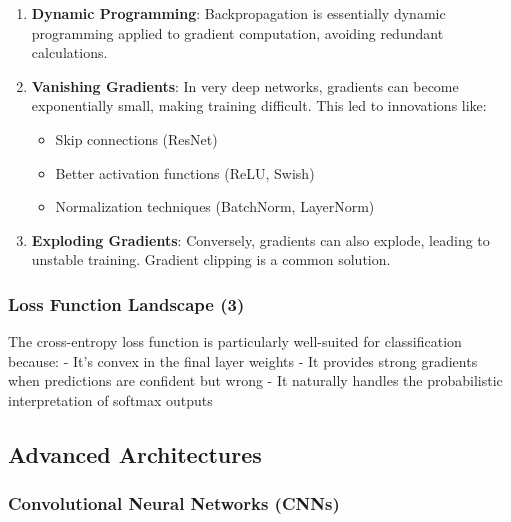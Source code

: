 \documentclass[
]{article}
\providecommand{\tightlist}{%
  \setlength{\itemsep}{0pt}\setlength{\parskip}{0pt}}
\begin{document}
\begin{enumerate}
\def\labelenumi{\arabic{enumi}.}
\setcounter{enumi}{1}
\item
  \textbf{Dynamic Programming}: Backpropagation is essentially dynamic
  programming applied to gradient computation, avoiding redundant
  calculations.
\item
  \textbf{Vanishing Gradients}: In very deep networks, gradients can
  become exponentially small, making training difficult. This led to
  innovations like:

  \begin{itemize}
  \tightlist
  \item
    Skip connections (ResNet)
  \item
    Better activation functions (ReLU, Swish)
  \item
    Normalization techniques (BatchNorm, LayerNorm)
  \end{itemize}
\item
  \textbf{Exploding Gradients}: Conversely, gradients can also explode,
  leading to unstable training. Gradient clipping is a common solution.
\end{enumerate}

\subsubsection{Loss Function Landscape
(3)}\label{loss-function-landscape-3}

The cross-entropy loss function is particularly well-suited for
classification because: - It's convex in the final layer weights - It
provides strong gradients when predictions are confident but wrong - It
naturally handles the probabilistic interpretation of softmax outputs

\subsection{Advanced Architectures}\label{advanced-architectures}

\subsubsection{Convolutional Neural Networks
(CNNs)}\label{convolutional-neural-networks-cnns}
\end{document}
